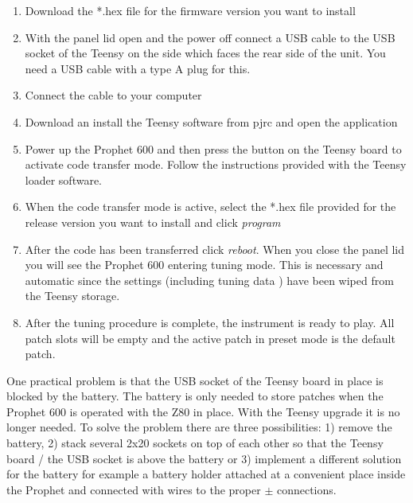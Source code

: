 \begin{enumerate}
  \item Download the *.hex file for the firmware version you want to install 
  \item With the panel lid open and the power off connect a USB cable to the USB socket of the Teensy on the side which faces the rear side of the unit. You need a USB cable with a type A plug for this. 
  \item Connect the cable to your computer 
  \item Download an install the Teensy software from pjrc \cite{teensyloader} and open the application 
  \item Power up the Prophet 600 and then press the button on the Teensy board to activate code transfer mode. Follow the instructions provided with the Teensy loader software. 
  \item When the code transfer mode is active, select the *.hex file provided for the release version you want to install and click \textit{program}
  \item After the code has been transferred click \textit{reboot}. When you close the panel lid you will see the Prophet 600 entering tuning mode. This is necessary and automatic since the settings (including tuning data ) have been wiped from the Teensy storage. 
  \item After the tuning procedure is complete, the instrument is ready to play. All patch slots will be empty and the active patch in preset mode is the default patch. 
\end{enumerate}

One practical problem is that the USB socket of the Teensy board in place is blocked by the battery. The battery is only needed to store patches when the Prophet 600 is operated with the Z80 in place. With the Teensy upgrade it is no longer needed. To solve the problem there are three possibilities: 1) remove the battery, 2) stack several 2x20 sockets on top of each other so that the Teensy board / the USB socket is above the battery or 3) implement a different solution for the battery for example a battery holder attached at a convenient place inside the Prophet and connected with wires to the proper $\pm$ connections. 
